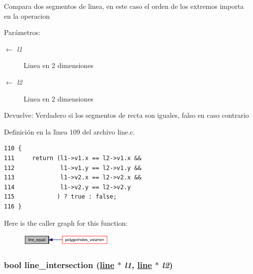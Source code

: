 Compara dos segmentos de linea, en este caso el orden de los extremos importa en la operacion

\begin{Desc}
\item[Par\'{a}metros:]
\begin{description}
\item[\mbox{$\leftarrow$} {\em l1}]Linea en 2 dimensiones \item[\mbox{$\leftarrow$} {\em l2}]Linea en 2 dimensiones \end{description}
\end{Desc}
\begin{Desc}
\item[Devuelve:]Verdadero si los segmentos de recta son iguales, falso en caso contrario \end{Desc}


Definici\'{o}n en la l\'{\i}nea 109 del archivo line.c.

\begin{Code}\begin{verbatim}110 {
111     return (l1->v1.x == l2->v1.x &&
112             l1->v1.y == l2->v1.y &&
113             l1->v2.x == l2->v2.x &&
114             l1->v2.y == l2->v2.y
115            ) ? true : false;
116 }
\end{verbatim}\end{Code}




Here is the caller graph for this function:\begin{figure}[H]
\begin{center}
\leavevmode
\includegraphics[width=130pt]{group__geometry_ga27fbafb04a36a60af7bd5cafbdfd412_ga27fbafb04a36a60af7bd5cafbdfd412_icgraph}
\end{center}
\end{figure}
\hypertarget{group__geometry_g95f804c79e71c1ca62453b6f0123e307_g95f804c79e71c1ca62453b6f0123e307}{
\subsubsection[line\_\-intersection]{\setlength{\rightskip}{0pt plus 5cm}bool line\_\-intersection (\hyperlink{struct__line}{line} $\ast$ {\em l1}, \hyperlink{struct__line}{line} $\ast$ {\em l2})}}
\label{group__geometry_g95f804c79e71c1ca62453b6f0123e307_g95f804c79e71c1ca62453b6f0123e307}


